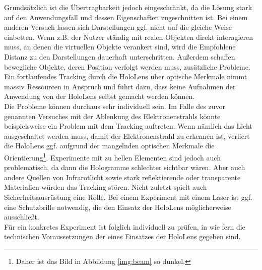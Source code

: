 Grundsätzlich ist die Übertragbarkeit jedoch eingeschränkt, da die Lösung stark auf den Anwendungsfall und dessen Eigenschaften zugeschnitten ist. Bei einem anderen Versuch lassen sich Darstellungen ggf. nicht auf die gleiche Weise einbetten. Wenn z.B. der Nutzer ständig mit realen Objekten direkt interagieren muss, an denen die virtuellen Objekte verankert sind, wird die Empfohlene Distanz zu den Darstellungen dauerhaft unterschritten. Außerdem schaffen bewegliche Objekte, deren Position verfolgt werden muss, zusätzliche Probleme. Ein fortlaufendes Tracking durch die HoloLens über optische Merkmale nimmt massiv Ressourcen in Anspruch und führt dazu, dass keine Aufnahmen der Anwendung von der HoloLens selbst gemacht werden können.\\

Die Probleme können durchaus sehr individuell sein. Im Falle des zuvor genannten Versuches mit der Ablenkung des Elektronenstrahls könnte beispielsweise ein Problem mit dem Tracking auftreten. Wenn nämlich das Licht ausgeschaltet werden muss, damit der Elektronenstrahl zu erkennen ist, verliert die HoloLens ggf. aufgrund der mangelnden optischen Merkmale die Orientierung\footnote{Daher ist das Bild in Abbildung \ref{img:beam} so dunkel.}. Experimente mit zu hellen Elementen sind jedoch auch problematisch, da dann die Hologramme schlechter sichtbar wären. Aber auch andere Quellen von Infrarotlicht sowie stark reflektierende oder transparente Materialien würden das Tracking stören. Nicht zuletzt spielt auch Sicherheitsausrüstung eine Rolle. Bei einem Experiment mit einem Laser ist ggf. eine Schutzbrille notwendig, die den Einsatz der HoloLens möglicherweise ausschließt.\\

Für ein konkretes Experiment ist folglich individuell zu prüfen, in wie fern die technischen Voraussetzungen der eines Einsatzes der HoloLens gegeben sind.
	
	
	
	
	
	
	
	
	
	
	